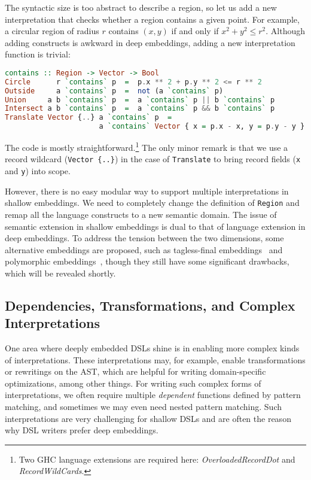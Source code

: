 The syntactic size is too abstract to describe a region, so let us add a new
interpretation that checks whether a region contains a given point. For example,
a circular region of radius $r$ contains $(x,y)$ if and only if $x^2 + y^2 \le
r^2$. Although adding constructs is awkward in deep embeddings, adding a new
interpretation function is trivial:

\begin{lstlisting}[language=Haskell]
contains :: Region -> Vector -> Bool
Circle      r `contains` p  =  p.x ** 2 + p.y ** 2 <= r ** 2
Outside     a `contains` p  =  not (a `contains` p)
Union     a b `contains` p  =  a `contains` p || b `contains` p
Intersect a b `contains` p  =  a `contains` p && b `contains` p
Translate Vector {..} a `contains` p  =
                      a `contains` Vector { x = p.x - x, y = p.y - y }
\end{lstlisting}

\noindent
The code is mostly straightforward.\footnote{Two GHC language extensions are
required here: \emph{OverloadedRecordDot} and \emph{RecordWildCards}.} The only
minor remark is that we use a record wildcard (\lstinline|Vector {..}|) in the
case of \lstinline{Translate} to bring record fields (\lstinline{x} and
\lstinline{y}) into scope.

However, there is no easy modular way to support multiple interpretations in
shallow embeddings. We need to completely change the definition of
\lstinline{Region} and remap all the language constructs to a new semantic
domain. The issue of semantic extension in shallow embeddings is dual to that of
language extension in deep embeddings. To address the tension between the two
dimensions, some alternative embeddings are proposed, such as tagless-final
embeddings~\citep{carette2009finally,kiselyov2010typed} and polymorphic
embeddings~\citep{hofer2008polymorphic}, though they still have some significant
drawbacks, which will be revealed shortly.

\subsection{Dependencies, Transformations, and Complex Interpretations} \label{sec:transform}

One area where deeply embedded DSLs shine is in enabling more complex kinds of
interpretations. These interpretations may, for example, enable transformations
or rewritings on the AST, which are helpful for writing domain-specific
optimizations, among other things. For writing such complex forms of
interpretations, we often require multiple \emph{dependent} functions defined by
pattern matching, and sometimes we may even need nested pattern matching. Such
interpretations are very challenging for shallow DSLs and are often the reason
why DSL writers prefer deep embeddings.

